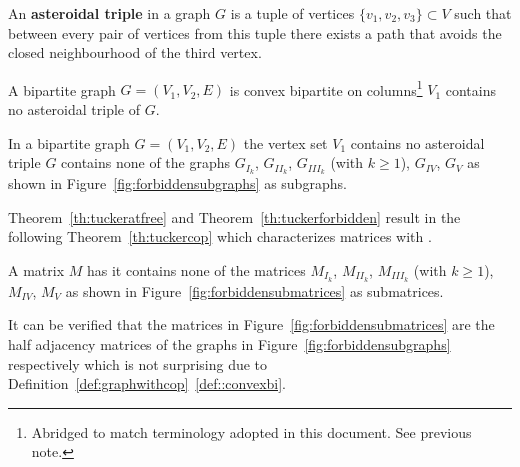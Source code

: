 \begin{definition}
  \label{def:asteroidal}
  An \textbf{asteroidal triple} in a graph $G$ is a tuple of vertices
  $\{v_1,v_2,v_3\} \subset V$ such that between every pair of vertices
  from this tuple there exists a path that avoids the closed
  neighbourhood of the third vertex.
\end{definition}

\begin{theoremsansproof}
  A bipartite graph $G = (V_1, V_2, E)$ is convex bipartite on
  columns\footnote{Abridged to match terminology adopted in this
    document. See previous note.} \iff $V_1$ contains no asteroidal
  triple of $G$.
  \label{th:tuckeratfree}
\end{theoremsansproof}

\begin{theoremsansproof}
  In a bipartite graph $G = (V_1, V_2, E)$ the vertex set $V_1$
  contains no asteroidal triple \iff $G$ contains none of the graphs
  $G_{I_k}$, $G_{II_k}$, $G_{III_k}$ (with $k \ge 1$), $G_{IV}$,
  $G_{V}$ as shown in Figure~\ref{fig:forbiddensubgraphs} as subgraphs.
  \label{th:tuckerforbidden}
\end{theoremsansproof}


\figforbiddensubgraphs


Theorem~\ref{th:tuckeratfree} and Theorem~\ref{th:tuckerforbidden}
result in the following Theorem~\ref{th:tuckercop} which characterizes
matrices with \COP.

\begin{theoremsansproof}
  A matrix $M$ has \COP \iff it contains none of the matrices 
$M_{I_k}$, $M_{II_k}$, $M_{III_k}$ (with $k \ge 1$), $M_{IV}$,
  $M_{V}$ as shown in Figure~\ref{fig:forbiddensubmatrices} as submatrices.
  \label{th:tuckercop}
\end{theoremsansproof}

\figforbiddensubmatrices

It can be verified that the matrices in
Figure~\ref{fig:forbiddensubmatrices} are the half adjacency matrices
of the graphs in Figure~\ref{fig:forbiddensubgraphs} respectively
which is not surprising due to
Definition~\ref{def:graphwithcop}~\ref{def::convexbi}.

